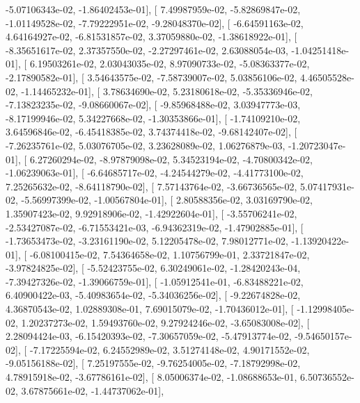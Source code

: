 \documentclass{article}
\begin{document}
         -5.07106343e-02,  -1.86402453e-01],
       [  7.49987959e-02,  -5.82869847e-02,  -1.01149528e-02,
         -7.79222951e-02,  -9.28048370e-02],
       [ -6.64591163e-02,   4.64164927e-02,  -6.81531857e-02,
          3.37059880e-02,  -1.38618922e-01],
       [ -8.35651617e-02,   2.37357550e-02,  -2.27297461e-02,
          2.63088054e-03,  -1.04251418e-01],
       [  6.19503261e-02,   2.03043035e-02,   8.97090733e-02,
         -5.08363377e-02,  -2.17890582e-01],
       [  3.54643575e-02,  -7.58739007e-02,   5.03856106e-02,
          4.46505528e-02,  -1.14465232e-01],
       [  3.78634690e-02,   5.23180618e-02,  -5.35336946e-02,
         -7.13823235e-02,  -9.08660067e-02],
       [ -9.85968488e-02,   3.03947773e-03,  -8.17199946e-02,
          5.34227668e-02,  -1.30353866e-01],
       [ -1.74109210e-02,   3.64596846e-02,  -6.45418385e-02,
          3.74374418e-02,  -9.68142407e-02],
       [ -7.26235761e-02,   5.03076705e-02,   3.23628089e-02,
          1.06276879e-03,  -1.20723047e-01],
       [  6.27260294e-02,  -8.97879098e-02,   5.34523194e-02,
         -4.70800342e-02,  -1.06239063e-01],
       [ -6.64685717e-02,  -4.24544279e-02,  -4.41773100e-02,
          7.25265632e-02,  -8.64118790e-02],
       [  7.57143764e-02,  -3.66736565e-02,   5.07417931e-02,
         -5.56997399e-02,  -1.00567804e-01],
       [  2.80588356e-02,   3.03169790e-02,   1.35907423e-02,
          9.92918906e-02,  -1.42922604e-01],
       [ -3.55706241e-02,  -2.53427087e-02,  -6.71553421e-03,
         -6.94362319e-02,  -1.47902885e-01],
       [ -1.73653473e-02,  -3.23161190e-02,   5.12205478e-02,
          7.98012771e-02,  -1.13920422e-01],
       [ -6.08100415e-02,   7.54364658e-02,   1.10756799e-01,
          2.33721847e-02,  -3.97824825e-02],
       [ -5.52423755e-02,   6.30249061e-02,  -1.28420243e-04,
         -7.39427326e-02,  -1.39066759e-01],
       [ -1.05912541e-01,  -6.83488221e-02,   6.40900422e-03,
         -5.40983654e-02,  -5.34036256e-02],
       [ -9.22674828e-02,   4.36870543e-02,   1.02889308e-01,
          7.69015079e-02,  -1.70436012e-01],
       [ -1.12998405e-02,   1.20237273e-02,   1.59493760e-02,
          9.27924246e-02,  -3.65083008e-02],
       [  2.28094424e-03,  -6.15420393e-02,  -7.30657059e-02,
         -5.47913774e-02,  -9.54650157e-02],
       [ -7.17225594e-02,   6.24552989e-02,   3.51274148e-02,
          4.90171552e-02,  -9.05156188e-02],
       [  7.25197555e-02,  -9.76254005e-02,  -7.18792998e-02,
          4.78915918e-02,  -3.67786161e-02],
       [  8.05006374e-02,  -1.08688653e-01,   6.50736552e-02,
          3.67875661e-02,  -1.44737062e-01],
\end{document}
